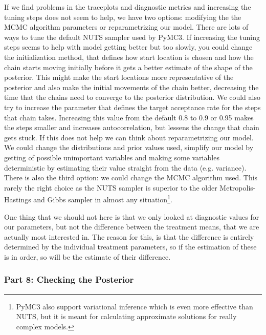 \documentclass[12pt,a4paper,leqno]{report}
\theoremstyle{plain}
\theoremstyle{definition}
\theoremstyle{remark}
\begin{document}
If we find problems in the traceplots and diagnostic metrics and increasing the tuning
steps does not seem to help, we have two options: modifying the
the MCMC algorithm parameters or reparametrizing our
model. There are lots of ways to tune the default NUTS sampler used by PyMC3. If
increasing the tuning steps seems to help with model getting better but too slowly, you
could change the initialization method, that defines how start location is chosen and how
the chain starts moving initially before it gets a better estimate of the shape of the
posterior. This might make the start locations more representative of the posterior and
also make the initial movements of the chain better, decreasing the time that the chains
need to converge to the posterior distribution. We could also try to increase the
parameter  that defines the target acceptance rate for the steps
that chain takes. Increasing this value from the default 0.8 to 0.9 or 0.95 makes the
steps smaller and increases autocorrelation, but lessens the change that chain gets
stuck. If this does not help we
can think about reparametrizing our model. We could change the distributions and prior
values used, simplify our model by getting of possible unimportant variables and making
some variables deterministic by estimating their value straight from the data (e.g.
variance). There is also the third option: we could change the MCMC algorithm used. This
rarely the right choice as the NUTS sampler is superior to the older Metropolis-Hastings
and Gibbs sampler in almost any situation\footnote{PyMC3 also support variational
inference which is even more effective than NUTS, but it is meant for calculating approximate
solutions for really complex models.}.


One thing that we should not here is that we only looked at diagnostic values for our
parameters, but not the difference between the treatment means, that we are actually
most interested in. The reason for this, is that the difference is entirely determined
by the individual treatment parameters, so if the estimation of these is in order, so
will be the estimate of their difference.


\subsubsection*{Part 8: Checking the Posterior}
\end{document}
